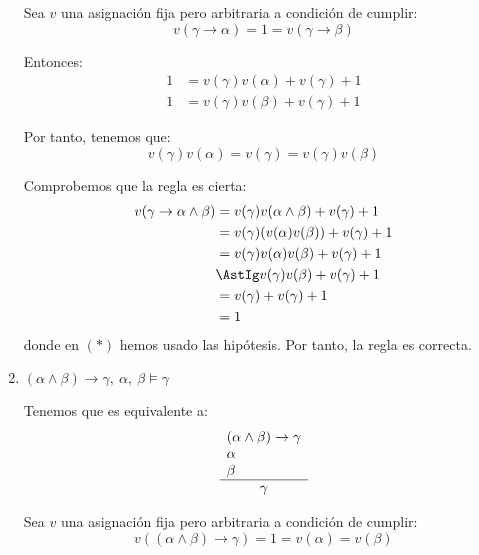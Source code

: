 \begin{ejercicio*}
\begin{enumerate}
        Sea $v$ una asignación fija pero arbitraria a condición de cumplir:
        \begin{equation*}
            v(\gamma\rightarrow\alpha)=1=v(\gamma\rightarrow\beta)
        \end{equation*}

        Entonces:
        \begin{align*}
            1 &= v(\gamma)v(\alpha)+v(\gamma)+1\\
            1 &= v(\gamma)v(\beta)+v(\gamma)+1
        \end{align*}

        Por tanto, tenemos que:
        \begin{equation*}
            v(\gamma)v(\alpha) = v(\gamma) = v(\gamma)v(\beta)
        \end{equation*}

        Comprobemos que la regla es cierta:
        \begin{align*}
            v(\gamma\rightarrow\alpha\land\beta) &= v(\gamma)v(\alpha\land\beta)+v(\gamma)+1\\
            &= v(\gamma)(v(\alpha)v(\beta))+v(\gamma)+1\\
            &= v(\gamma)v(\alpha)v(\beta)+v(\gamma)+1\\
            &\AstIg v(\gamma)v(\beta)+v(\gamma)+1\\
            &= v(\gamma)+v(\gamma)+1\\
            &= 1
        \end{align*}
        donde en $(\ast)$ hemos usado las hipótesis.
        Por tanto, la regla es correcta.

        \item $(\alpha\land\beta)\rightarrow\gamma,~\alpha,~\beta \vDash \gamma$

        Tenemos que es equivalente a:
        \begin{equation*}
            \begin{array}{l}
                (\alpha\land\beta)\rightarrow\gamma\\
                \alpha\\
                \beta\\ \hline
                \multicolumn{1}{c}{\gamma}
            \end{array}
        \end{equation*}

        Sea $v$ una asignación fija pero arbitraria a condición de cumplir:
        \begin{equation*}
            v((\alpha\land\beta)\rightarrow\gamma)=1=v(\alpha)=v(\beta)
        \end{equation*}


\end{enumerate}
\end{ejercicio*}
